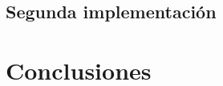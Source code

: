 \documentclass{report}
\begin{document}
        \paragraph{}{

        }
      \section{Segunda implementación}
        \paragraph{}{

        }
    \chapter{Conclusiones}
      \paragraph{}{

      }
    
    
\end{document}
